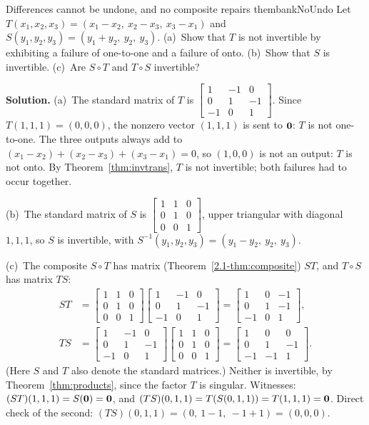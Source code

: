 \documentclass[11pt]{article}
\begin{document}
\begin{exmp}{Differences cannot be undone, and no composite repairs them}{bankNoUndo}
Let $T(x_1,x_2,x_3)=(x_1-x_2,\ x_2-x_3,\ x_3-x_1)$ and $S(y_1,y_2,y_3)=(y_1+y_2,\ y_2,\ y_3)$. (a)~Show that $T$ is not invertible by exhibiting a failure of one-to-one and a failure of onto. (b)~Show that $S$ is invertible. (c)~Are $S\circ T$ and $T\circ S$ invertible?

\textbf{Solution.} (a)~The standard matrix of $T$ is $\begin{bmatrix}1&-1&0\\0&1&-1\\-1&0&1\end{bmatrix}$. Since $T(1,1,1)=(0,0,0)$, the nonzero vector $(1,1,1)$ is sent to $\mathbf{0}$: $T$ is not one-to-one. The three outputs always add to $(x_1-x_2)+(x_2-x_3)+(x_3-x_1)=0$, so $(1,0,0)$ is not an output: $T$ is not onto. By Theorem~\ref{thm:invtrans}, $T$ is not invertible; both failures had to occur together.

(b)~The standard matrix of $S$ is $\begin{bmatrix}1&1&0\\0&1&0\\0&0&1\end{bmatrix}$, upper triangular with diagonal $1,1,1$, so $S$ is invertible, with $S^{-1}(y_1,y_2,y_3)=(y_1-y_2,\ y_2,\ y_3)$.

(c)~The composite $S\circ T$ has matrix (Theorem~\ref{2.1-thm:composite}) $ST$, and $T\circ S$ has matrix $TS$:
\begin{align*}
ST&=\begin{bmatrix}1&1&0\\0&1&0\\0&0&1\end{bmatrix}\begin{bmatrix}1&-1&0\\0&1&-1\\-1&0&1\end{bmatrix}=\begin{bmatrix}1&0&-1\\0&1&-1\\-1&0&1\end{bmatrix},\\[4pt]
TS&=\begin{bmatrix}1&-1&0\\0&1&-1\\-1&0&1\end{bmatrix}\begin{bmatrix}1&1&0\\0&1&0\\0&0&1\end{bmatrix}=\begin{bmatrix}1&0&0\\0&1&-1\\-1&-1&1\end{bmatrix}.
\end{align*}
(Here $S$ and $T$ also denote the standard matrices.) Neither is invertible, by Theorem~\ref{thm:products}, since the factor $T$ is singular. Witnesses: $(ST)(1,1,1)=S(\mathbf{0})=\mathbf{0}$, and $(TS)(0,1,1)=T(S(0,1,1))=T(1,1,1)=\mathbf{0}$. Direct check of the second: $(TS)(0,1,1)=(0,\ 1-1,\ -1+1)=(0,0,0)$.


\end{exmp}
\end{document}
